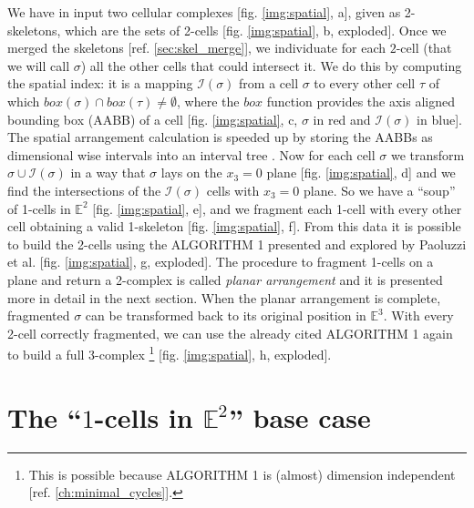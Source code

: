 We have in input two cellular complexes [fig. \ref{img:spatial}, a], 
given as 2-skeletons, which are the sets of 2-cells 
[fig. \ref{img:spatial}, b, exploded]. Once we merged the skeletons
[ref. \ref{sec:skel_merge}], we individuate for each $2$-cell (that we will call $\sigma$)
all the other cells that could intersect it. We do this by computing
the spatial index: it is a mapping $\mathcal{I}(\sigma)$ from a cell $\sigma$ to every other 
cell $\tau$ of which $box(\sigma) \cap box(\tau) \neq \emptyset$, where 
the $box$ function provides the axis aligned bounding box (AABB) of a cell [fig. \ref{img:spatial}, c, 
$\sigma$ in red and $\mathcal{I}(\sigma)$ in blue]. The spatial arrangement
calculation is speeded up by storing the AABBs as dimensional wise intervals
into an interval tree \cite{interval_trees}. 
Now for each cell $\sigma$ we transform $\sigma \cup \mathcal{I}(\sigma)$ 
in a way that $\sigma$ lays on the $x_3=0$ plane [fig. \ref{img:spatial}, d] and we find the intersections 
of the $\mathcal{I}(\sigma)$ cells with $x_3=0$ plane. So we have a ``soup''
of 1-cells in $\mathbb{E}^2$ [fig. \ref{img:spatial}, e], and we fragment each 1-cell 
with every other cell obtaining a valid 1-skeleton [fig. \ref{img:spatial}, f].
From this data it is possible to build the 2-cells using the ALGORITHM 1
presented and explored by Paoluzzi et al. \cite{Paoluzzi}
[fig. \ref{img:spatial}, g, exploded]. The procedure to fragment 1-cells
on a plane and return a 2-complex is called \textit{planar arrangement} and it
is presented more in detail in the next section. When the planar arrangement is
complete, fragmented $\sigma$ can be transformed back to its original position
in $\mathbb{E}^3$. With every 2-cell correctly fragmented, we can use the 
already cited ALGORITHM 1 again to build a full 3-complex%
\footnote{This is possible because ALGORITHM 1 is (almost) dimension independent
[ref. \ref{ch:minimal_cycles}].} [fig. \ref{img:spatial}, h, exploded].


\section{The ``$1$-cells in $\mathbb{E}^2$'' base case}
\label{sec:planar_arrangement_overview}

